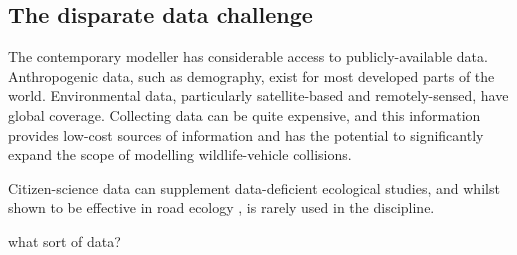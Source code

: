 %

\subsection{The disparate data challenge}
%
The contemporary modeller has considerable access to publicly-available data. Anthropogenic data, such as demography, exist for most developed parts of the world. Environmental data, particularly satellite-based and remotely-sensed, have global coverage. Collecting data can be quite expensive, and this information provides low-cost sources of information and has the potential to significantly expand the scope of modelling wildlife-vehicle collisions.

Citizen-science data can supplement data-deficient ecological studies, and whilst shown to be effective in road ecology \citep{paul14}, is rarely used in the discipline.

what sort of data?

